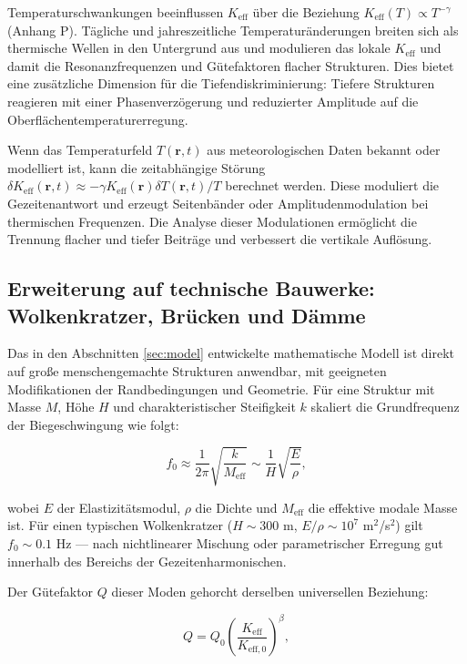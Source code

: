 \documentclass[12pt,a4paper]{article}
\theoremstyle{remark}
\newcommand{\Keff}{K_{\mathrm{eff}}}
\begin{document}
	Temperaturschwankungen beeinflussen $\Keff$ über die Beziehung $\Keff(T) \propto T^{-\gamma}$ (Anhang P). Tägliche und jahreszeitliche Temperaturänderungen breiten sich als thermische Wellen in den Untergrund aus und modulieren das lokale $\Keff$ und damit die Resonanzfrequenzen und Gütefaktoren flacher Strukturen. Dies bietet eine zusätzliche Dimension für die Tiefendiskriminierung: Tiefere Strukturen reagieren mit einer Phasenverzögerung und reduzierter Amplitude auf die Oberflächentemperaturerregung.
	
	Wenn das Temperaturfeld $T(\mathbf{r},t)$ aus meteorologischen Daten bekannt oder modelliert ist, kann die zeitabhängige Störung $\delta \Keff(\mathbf{r},t) \approx -\gamma \Keff(\mathbf{r}) \delta T(\mathbf{r},t)/T$ berechnet werden. Diese moduliert die Gezeitenantwort und erzeugt Seitenbänder oder Amplitudenmodulation bei thermischen Frequenzen. Die Analyse dieser Modulationen ermöglicht die Trennung flacher und tiefer Beiträge und verbessert die vertikale Auflösung.
	
	\subsection{Erweiterung auf technische Bauwerke: Wolkenkratzer, Brücken und Dämme}
	\label{sec:structures}
	
	Das in den Abschnitten \ref{sec:model} entwickelte mathematische Modell ist direkt auf große menschengemachte Strukturen anwendbar, mit geeigneten Modifikationen der Randbedingungen und Geometrie. Für eine Struktur mit Masse \(M\), Höhe \(H\) und charakteristischer Steifigkeit \(k\) skaliert die Grundfrequenz der Biegeschwingung wie folgt:
	
	\begin{equation}
		f_0 \approx \frac{1}{2\pi} \sqrt{\frac{k}{M_{\mathrm{eff}}}} \sim \frac{1}{H} \sqrt{\frac{E}{\rho}},
		\label{eq:structural-frequency}
	\end{equation}
	
	wobei \(E\) der Elastizitätsmodul, \(\rho\) die Dichte und \(M_{\mathrm{eff}}\) die effektive modale Masse ist. Für einen typischen Wolkenkratzer (\(H \sim 300\) m, \(E/\rho \sim 10^7\) m\(^2\)/s\(^2\)) gilt \(f_0 \sim 0.1\) Hz — nach nichtlinearer Mischung oder parametrischer Erregung gut innerhalb des Bereichs der Gezeitenharmonischen.
	
	Der Gütefaktor \(Q\) dieser Moden gehorcht derselben universellen Beziehung:
	
	\begin{equation}
		Q = Q_0 \left( \frac{K_{\mathrm{eff}}}{K_{\mathrm{eff},0}} \right)^{\beta},
		\label{eq:structural-Q}
	\end{equation}
	
\end{document}
